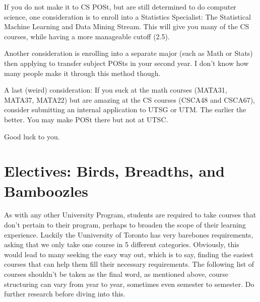 \documentclass[11pt]{article}
\begin{document}
If you do not make it to CS POSt, but are still determined to do
computer science, one consideration is to enroll into a Statistics
Specialist: The Statistical Machine Learning and Data Mining Stream.
This will give you many of the CS courses, while having a more
manageable cutoff (2.5).

Another consideration is enrolling into a separate major (such as Math
or Stats) then applying to transfer subject POSts in your second year. I
don't know how many people make it through this method though.

A last (weird) consideration: If you suck at the math courses (MATA31,
MATA37, MATA22) but are amazing at the CS courses (CSCA48 and CSCA67),
consider submitting an internal application to UTSG or UTM. The earlier
the better. You may make POSt there but not at UTSC.

Good luck to you.


\section{Electives: Birds, Breadths, and Bamboozles}
As with any other University Program, students are required to take
courses that don't pertain to their program, perhaps to broaden the
scope of their learning experience. Luckily the Uuniversity of Toronto
has very barebones requirements, asking that we only take one course
in 5 different categories. Obviously, this would lead to many seeking
the easy way out, which is to say, finding the easiest courses that
can help them fill their necessary requirements. The following list
of courses shouldn't be taken as the final word, as mentioned above,
course structuring can vary from year to year, sometimes even semester
to semester. Do further research before diving into this.
\end{document}
